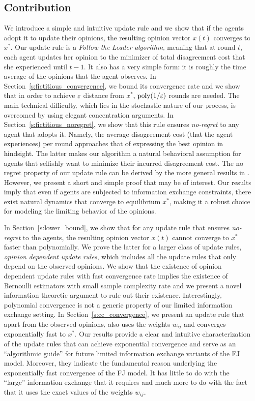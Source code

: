 \subsection{Contribution}

We introduce a simple and intuitive update rule and we show that if the agents
adopt it to update their opinions, the
resulting opinion vector $x(t)$ converges to $x^*$.  Our update rule is a
\emph{Follow the Leader algorithm}, meaning that at round $t$, each agent
updates her opinion to the minimizer of total disagreement cost that she
experienced until $t-1$.  It also has a very simple form: it is roughly the time average
of the opinions that the agent observes.  In
Section~\ref{s:fictitious_convergence}, we bound its convergence rate and we
show that in order to achieve $\varepsilon$ distance from $x^*$, $\mathrm{poly}(1/\varepsilon)$ rounds
are needed. The main technical difficulty, which lies in the stochastic nature of our
process, is overcomed by using elegant concentration arguments.  In
Section~\ref{s:fictitious_noregret}, we show that this rule ensures
\emph{no-regret} to any agent that adopts it.  Namely, the average disagreement
cost (that the agent experiences) per round approaches that of expressing the
best opinion in hindsight.  The latter makes our algorithm a natural behavioral
assumption for agents that selfishly want to minimize their incurred
disagreement cost.  The no regret property of our update rule can be derived by
the more general results in \cite{HAK07}.  However, we present a short and
simple proof that may be of interest.  Our results imply that even if agents
are subjected to information exchange constraints, there exist natural
dynamics that converge to equilibrium $x^*$, making it a robust choice for
modeling the limiting behavior of the opinions.

In Section~\ref{s:lower_bound}, we show that for any update rule that ensures
\emph{no-regret} to the agents, the resulting opinion vector $x(t)$ cannot
converge to $x^*$ faster than polynomially.  We prove the latter for a larger
class of update rules, \emph{opinion dependent update rules}, which includes all
the update rules that only depend on the observed opinions.  We show that
the existence of opinion dependent update rules with fast convergence rate
implies the existence of Bernoulli estimators with small sample complexity rate and we
present a novel information theoretic argument to rule out their existence.
Interestingly, polynomial convergence is not a generic property of our limited
information exchange setting.  In Section~\ref{s:cc_convergence}, we present an
update rule that apart from the observed opinions, also uses the weights
$w_{ij}$ and converges exponentially fast to $x^*$. Our results provide a clear
and intuitive characterization of the update rules that can achieve exponential
convergence and serve as an \enquote{algorithmic guide} for future limited
information exchange variants of the FJ model.  Moreover, they indicate the
fundamental reason underlying the exponentially fast convergence of the FJ model.
It has
little to do with the \enquote{large} information exchange that it requires and
much more to do with the fact that it uses the exact values of the weights
$w_{ij}$.

